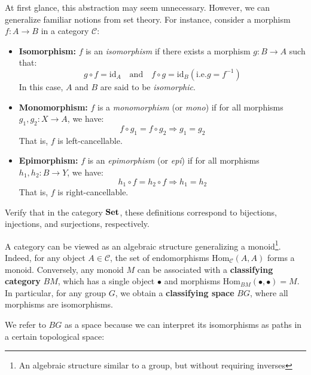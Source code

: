 At first glance, this abstraction may seem unnecessary. However, we can generalize familiar notions from set theory. For instance, consider a morphism $f: A \to B$ in a category $\mathcal{C}$:

\begin{itemize}
    \item \textbf{Isomorphism:} $f$ is an \emph{isomorphism} if there exists a morphism $g: B \to A$ such that:
    \[
      g \circ f = \mathrm{id}_A \quad \text{and} \quad f \circ g = \mathrm{id}_B (\text{i.e.} g=f^{-1})
    \]
    In this case, $A$ and $B$ are said to be \emph{isomorphic}.

    \item \textbf{Monomorphism:} $f$ is a \emph{monomorphism} (or \emph{mono}) if for all morphisms $g_1, g_2: X \to A$, we have:
    \[
    f \circ g_1 = f \circ g_2 \Rightarrow g_1 = g_2
    \]
    That is, $f$ is left-cancellable.

    \item \textbf{Epimorphism:} $f$ is an \emph{epimorphism} (or \emph{epi}) if for all morphisms $h_1, h_2: B \to Y$, we have:
    \[
    h_1 \circ f = h_2 \circ f \Rightarrow h_1 = h_2
    \]
    That is, $f$ is right-cancellable.

\end{itemize}
\begin{exercise}
Verify that in the category $\mathbf{Set}$, these definitions correspond to bijections, injections, and surjections, respectively.
\end{exercise}

\begin{example}
  A category can be viewed as an algebraic structure generalizing a monoid\footnote{An algebraic structure similar to a group, but without requiring inverses}. Indeed, for any object $A \in \mathcal{C}$, the set of endomorphisms $\mathrm{Hom}_{\mathcal{C}}(A, A)$ forms a monoid. Conversely, any monoid $M$ can be associated with a \textbf{classifying category} $BM$, which has a single object $\bullet$ and morphisms $\mathrm{Hom}_{BM}(\bullet, \bullet) = M$. In particular, for any group $G$, we obtain a \textbf{classifying space} $BG$, where all morphisms are isomorphisms.
\end{example}

We refer to $BG$ as a space because we can interpret its isomorphisms as paths in a certain topological space:

